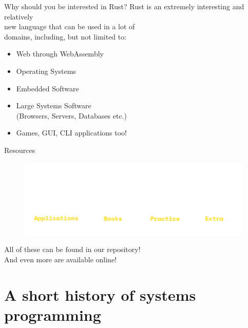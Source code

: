 \documentclass[usenames,dvipsnames,10pt,aspectratio=169]{beamer}
\begin{document}
\begin{frame}{Why should you be interested in Rust?}
	\large
	Rust is an extremely interesting and relatively\\
	new language that can be used in a lot of\\
	domains, including, but not limited to:\\
	\vspace{0.4cm}
	\begin{itemize}[label=$\bullet$]
		\item Web through WebAssembly
		\item Operating Systems
		\item Embedded Software
		\item Large Systems Software\\
			(Browsers, Servers, Databases etc.)
		\item Games, GUI, CLI applications too!
	\end{itemize}
\end{frame}

\begin{frame}{Resources}
	\Large
	\centering
	\begin{figure}[c]
		\includegraphics[width=1\linewidth]{graphics/resources.png}
	\end{figure}
	All of these can be found in our repository!\\
	And even more are available online!\\
	\vspace{1cm}
\end{frame}




\section{A short history of systems programming}
\end{document}
